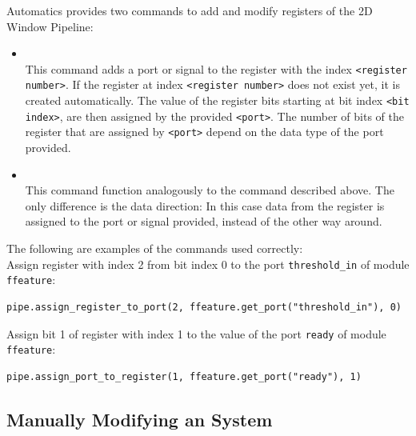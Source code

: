 Automatics provides two commands to add and modify registers of the 2D Window Pipeline:
\begin{itemize}
\item {}\\
This command adds a port or signal to the register with the index \texttt{<register number>}.
If the register at index \texttt{<register number>} does not exist yet, it is created automatically.
The value of the register bits starting at bit index \texttt{<bit index>}, are then assigned by the provided \texttt{<port>}.
The number of bits of the register that are assigned by \texttt{<port>} depend on the data type of the port provided.
\item {}\\
This command function analogously to the command described above.
The only difference is the data direction: In this case data from the register is assigned to the port or signal provided, instead of the other way around. 
\end{itemize}

The following are examples of the commands used correctly:\\
Assign register with index 2 from bit index 0 to the port \texttt{threshold\_in} of module \texttt{ffeature}:
\begin{lstlisting}[style=AutomaticsPython]
pipe.assign_register_to_port(2, ffeature.get_port("threshold_in"), 0)
\end{lstlisting}
Assign bit 1 of register with index 1 to the value of the port \texttt{ready} of module \texttt{ffeature}:
\begin{lstlisting}[style=AutomaticsPython]
pipe.assign_port_to_register(1, ffeature.get_port("ready"), 1)
\end{lstlisting}




\subsection{Manually Modifying an \asterics System}
\label{ssec:02-manual}

